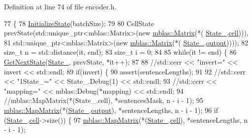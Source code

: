 Definition at line 74 of file encoder.\+h.


\begin{DoxyCode}
77         \{
78           \hyperlink{classamunmt_1_1GPU_1_1Encoder_1_1RNN_adcec5cfc611a4231bc91cb176ad255ba}{InitializeState}(batchSize);
79 
80           CellState prevState(std::unique\_ptr<mblas::Matrix>(\textcolor{keyword}{new} \hyperlink{namespaceamunmt_1_1GPU_1_1mblas_ab67821a8254de53e45a623cf73c0aef6}{mblas::Matrix}(*(
      \hyperlink{classamunmt_1_1GPU_1_1Encoder_1_1RNN_a2c27e8bf2554193cd582200e7e6fed12}{State\_}.\hyperlink{structamunmt_1_1GPU_1_1CellState_a3d8d1a31845d19b6b635b0a99029e21a}{cell}))),
81                               std::unique\_ptr<mblas::Matrix>(\textcolor{keyword}{new} \hyperlink{namespaceamunmt_1_1GPU_1_1mblas_ab67821a8254de53e45a623cf73c0aef6}{mblas::Matrix}(*(
      \hyperlink{classamunmt_1_1GPU_1_1Encoder_1_1RNN_a2c27e8bf2554193cd582200e7e6fed12}{State\_}.\hyperlink{structamunmt_1_1GPU_1_1CellState_ac2d94a4fd199fe8458529a075b9df1b7}{output}))));
82           \textcolor{keywordtype}{size\_t} n = std::distance(it, end);
83           \textcolor{keywordtype}{size\_t} i = 0;
84 
85           \textcolor{keywordflow}{while}(it != end) \{
86             \hyperlink{classamunmt_1_1GPU_1_1Encoder_1_1RNN_a52f3ef3e44fc6bf70543d5b264beba94}{GetNextState}(\hyperlink{classamunmt_1_1GPU_1_1Encoder_1_1RNN_a2c27e8bf2554193cd582200e7e6fed12}{State\_}, prevState, *it++);
87 
88             \textcolor{comment}{//std::cerr << "invert=" << invert << std::endl;}
89             \textcolor{keywordflow}{if}(invert) \{
90               assert(sentenceLengths);
91 
92               \textcolor{comment}{//std::cerr << "1State\_=" << State\_.Debug(1) << std::endl;}
93               \textcolor{comment}{//std::cerr << "mapping=" << mblas::Debug(*mapping) << std::endl;}
94               \textcolor{comment}{//mblas::MapMatrix(*(State\_.cell), *sentencesMask, n - i - 1);}
95               \hyperlink{namespaceamunmt_1_1GPU_1_1mblas_ac4634f9a58b95ccdd997393c75a9fc69}{mblas::MapMatrix}(*(\hyperlink{classamunmt_1_1GPU_1_1Encoder_1_1RNN_a2c27e8bf2554193cd582200e7e6fed12}{State\_}.\hyperlink{structamunmt_1_1GPU_1_1CellState_ac2d94a4fd199fe8458529a075b9df1b7}{output}), *sentenceLengths, n - i - 1);
96               \textcolor{keywordflow}{if} (\hyperlink{classamunmt_1_1GPU_1_1Encoder_1_1RNN_a2c27e8bf2554193cd582200e7e6fed12}{State\_}.\hyperlink{structamunmt_1_1GPU_1_1CellState_a3d8d1a31845d19b6b635b0a99029e21a}{cell}->size()) \{
97                 \hyperlink{namespaceamunmt_1_1GPU_1_1mblas_ac4634f9a58b95ccdd997393c75a9fc69}{mblas::MapMatrix}(*(\hyperlink{classamunmt_1_1GPU_1_1Encoder_1_1RNN_a2c27e8bf2554193cd582200e7e6fed12}{State\_}.\hyperlink{structamunmt_1_1GPU_1_1CellState_a3d8d1a31845d19b6b635b0a99029e21a}{cell}), *sentenceLengths, n - i - 1);

\end{DoxyCode}
